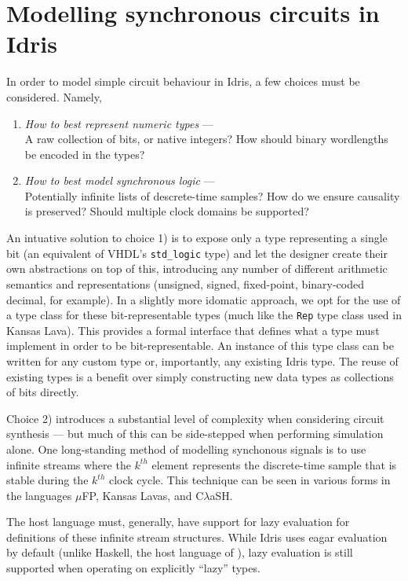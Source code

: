 \documentclass[conference]{IEEEtran}
\begin{document}
\section{Modelling synchronous circuits in Idris}

In order to model simple circuit behaviour in Idris, a few choices must be considered. Namely,
\begin{enumerate}
\item \emph{How to best represent numeric types} --- \\A raw collection of bits, or
  native integers? How should binary wordlengths be encoded in the types?
\item \emph{How to best model synchronous logic} --- \\Potentially infinite lists of
  descrete-time samples? How do we ensure causality is preserved? Should
  multiple clock domains be supported?
\end{enumerate}

An intuative solution to choice 1) is to expose only a type representing a
single bit (an equivalent of VHDL's \texttt{std\_logic} type) and let the
designer create their own abstractions on top of this, introducing any number of
different arithmetic semantics and representations (unsigned, signed,
fixed-point, binary-coded decimal, for example). In a slightly more idomatic
approach, we opt for the use of a type class for these bit-representable types
(much like the \texttt{Rep} type class used in Kansas Lava\cite{gill_13}). This
provides a formal interface that defines what a type must implement in order to
be bit-representable. An instance of this type class can be written for any
custom type or, importantly, any existing Idris type. The reuse of existing
types is a benefit over simply constructing new data types as collections of
bits directly.

Choice 2) introduces a substantial level of complexity when considering circuit
synthesis --- but much of this can be side-stepped when performing simulation
alone. One long-standing method of modelling synchonous signals is to use
infinite streams where the $k^{th}$ element represents the discrete-time sample
that is stable during the $k^{th}$ clock cycle. This technique can be seen in
various forms in the languages $\mu$FP\cite{ufp}, Kansas Lavas\cite{gill_09},
and C$\lambda$aSH\cite{baaij_15}.

The host language must, generally, have support for lazy evaluation for
definitions of these infinite stream structures. While Idris uses eagar
evaluation by default (unlike Haskell, the host language of
\cite{gill_09,baaij_15}), lazy evaluation is still supported when operating on
explicitly ``lazy'' types.
\end{document}
